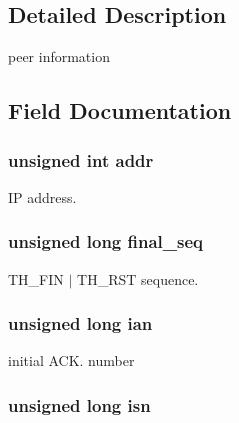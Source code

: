 \subsection{Detailed Description}
peer information 

\subsection{Field Documentation}
\hypertarget{structntoh__tcp__peer__t_ab36863a07751ac73459d46b677c33b57}{
\subsubsection[{addr}]{\setlength{\rightskip}{0pt plus 5cm}unsigned int addr}}\label{structntoh__tcp__peer__t_ab36863a07751ac73459d46b677c33b57}


I\-P address. 

\hypertarget{structntoh__tcp__peer__t_a9ed11c1f20c424d3a4edf704ecf07d93}{
\subsubsection[{final\-\_\-seq}]{\setlength{\rightskip}{0pt plus 5cm}unsigned long final\-\_\-seq}}\label{structntoh__tcp__peer__t_a9ed11c1f20c424d3a4edf704ecf07d93}


T\-H\-\_\-\-F\-I\-N $\vert$ T\-H\-\_\-\-R\-S\-T sequence. 

\hypertarget{structntoh__tcp__peer__t_acfab4beb8833b2e45a3d02b1b8eb2ae3}{
\subsubsection[{ian}]{\setlength{\rightskip}{0pt plus 5cm}unsigned long ian}}\label{structntoh__tcp__peer__t_acfab4beb8833b2e45a3d02b1b8eb2ae3}


initial A\-C\-K. number 

\hypertarget{structntoh__tcp__peer__t_a9e6dafb622805bf2612b302c10f18ba5}{
\subsubsection[{isn}]{\setlength{\rightskip}{0pt plus 5cm}unsigned long isn}}\label{structntoh__tcp__peer__t_a9e6dafb622805bf2612b302c10f18ba5}


